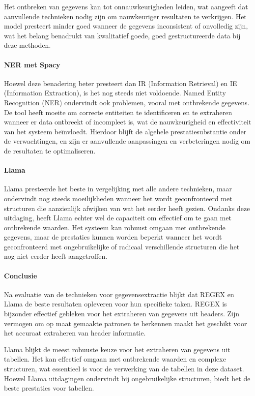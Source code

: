Het ontbreken van gegevens kan tot onnauwkeurigheden leiden, wat aangeeft dat aanvullende technieken nodig zijn om nauwkeuriger resultaten te verkrijgen. Het model presteert minder goed wanneer de gegevens inconsistent of onvolledig zijn, wat het belang benadrukt van kwalitatief goede, goed gestructureerde data bij deze methoden. 


\paragraph{NER met Spacy}
Hoewel deze benadering beter presteert dan IR (Information Retrieval) en IE (Information Extraction), is het nog steeds niet voldoende. Named Entity Recognition (NER) ondervindt ook problemen, vooral met ontbrekende gegevens. De tool heeft moeite om correcte entiteiten te identificeren en te extraheren wanneer er data ontbreekt of incompleet is, wat de nauwkeurigheid en effectiviteit van het systeem beïnvloedt. Hierdoor blijft de algehele prestatiesubstantie onder de verwachtingen, en zijn er aanvullende aanpassingen en verbeteringen nodig om de resultaten te optimaliseren.
\paragraph{Llama}
Llama presteerde het beste in vergelijking met alle andere technieken, maar ondervindt nog steeds moeilijkheden wanneer het wordt geconfronteerd met structuren die aanzienlijk afwijken van wat het eerder heeft gezien. Ondanks deze uitdaging, heeft Llama echter wel de capaciteit om effectief om te gaan met ontbrekende waarden. Het systeem kan robuust omgaan met ontbrekende gegevens, maar de prestaties kunnen worden beperkt wanneer het wordt geconfronteerd met ongebruikelijke of radicaal verschillende structuren die het nog niet eerder heeft aangetroffen.

\paragraph{Conclusie}


Na evaluatie van de technieken voor gegevensextractie blijkt dat REGEX en Llama de beste resultaten opleveren voor hun specifieke taken. REGEX is bijzonder effectief gebleken voor het extraheren van gegevens uit headers. Zijn vermogen om op maat gemaakte patronen te herkennen maakt het geschikt voor het accuraat extraheren van header informatie. 

Llama blijkt de meest robuuste keuze voor het extraheren van gegevens uit tabellen. Het kan effectief omgaan met ontbrekende waarden en complexe structuren, wat essentieel is voor de verwerking van de tabellen in deze dataset. Hoewel Llama uitdagingen ondervindt bij ongebruikelijke structuren, biedt het de beste prestaties voor tabellen.

